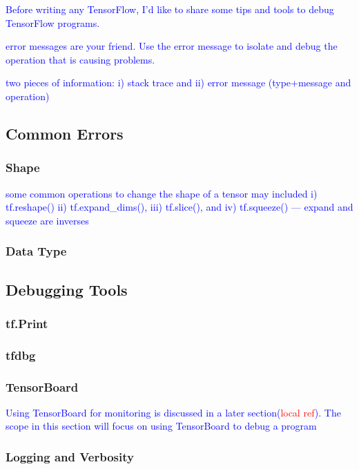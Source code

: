 \textcolor{blue}{Before writing any TensorFlow, I'd like to share some tips and tools to debug TensorFlow programs.}


\textcolor{blue}{error messages are your friend. Use the error message to isolate and debug the operation that is causing problems.}

\textcolor{blue}{two pieces of information: i) stack trace and ii) error message (type+message and operation) }

\subsection{Common Errors}
\subsubsection{Shape}

\textcolor{blue}{some common operations to change the shape of a tensor may included i) tf.reshape() ii) tf.expand\_dims(), iii) tf.slice(), and iv) tf.squeeze() --- expand and squeeze are inverses} 

\subsubsection{Data Type}

\subsection{Debugging Tools}

\subsubsection{tf.Print}

\subsubsection{tfdbg}



\subsubsection{TensorBoard}


\textcolor{blue}{Using TensorBoard for monitoring is discussed in a later section(\textcolor{red}{local ref}). The scope in this section will focus on using TensorBoard to debug a program}

\subsubsection{Logging and Verbosity}






